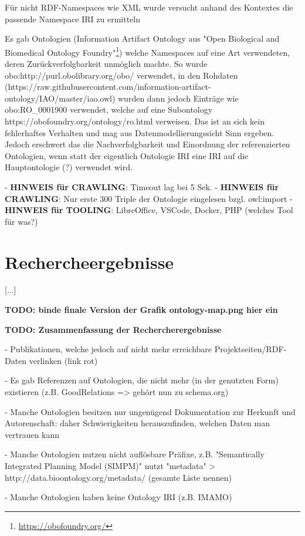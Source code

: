 \documentclass{article}
\begin{document}
Für nicht RDF-Namespaces wie XML wurde versucht anhand des Kontextes die passende Namespace IRI zu ermitteln

Es gab Ontologien (Information Artifact Ontology aus "Open Biological and Biomedical Ontology Foundry"\footnote{\url{https://obofoundry.org/}}) welche Namespaces auf eine Art verwendeten, deren Zurückverfolgbarkeit unmöglich machte.
So wurde obo:http://purl.obolibrary.org/obo/ verwendet, in den Rohdaten (https://raw.githubusercontent.com/information-artifact-ontology/IAO/master/iao.owl) wurden dann jedoch Einträge wie obo:RO\_0001900 verwendet, welche auf eine Subontology https://obofoundry.org/ontology/ro.html verweisen.
Das ist an sich kein fehlerhaftes Verhalten und mag aus Datenmodellierungssicht Sinn ergeben.
Jedoch erschwert das die Nachverfolgbarkeit und Einordnung der referenzierten Ontologien, wenn statt der eigentlich Ontologie IRI eine IRI auf die Hauptontologie (?) verwendet wird.

- \textbf{HINWEIS für CRAWLING}: Timeout lag bei 5 Sek.
- \textbf{HINWEIS für CRAWLING}: Nur erste 300 Triple der Ontologie eingelesen bzgl. owl:import
- \textbf{HINWEIS für TOOLING}: LibreOffice, VSCode, Docker, PHP (welches Tool für was?)

\section{Rechercheergebnisse}

[...]

\textbf{TODO: binde finale Version der Grafik ontology-map.png hier ein}

\textbf{TODO: Zusammenfassung der Rechercherergebnisse}

- Publikationen, welche jedoch auf nicht mehr erreichbare Projektseiten/RDF-Daten verlinken (link rot)

- Es gab Referenzen auf Ontologien, die nicht mehr (in der genutzten Form) existieren (z.B. GoodRelations => gehört nun zu schema.org)

- Manche Ontologien besitzen nur ungenügend Dokumentation zur Herkunft und Autorenschaft: daher Schwierigkeiten herauszufinden, welchen Daten man vertrauen kann

- Manche Ontologien nutzen nicht auflösbare Präfixe, z.B. "Semantically Integrated Planning Model (SIMPM)" nutzt "metadata" > http://data.bioontology.org/metadata/ (gesamte Liste nennen)

- Manche Ontologien haben keine Ontology IRI (z.B. IMAMO)
\end{document}
